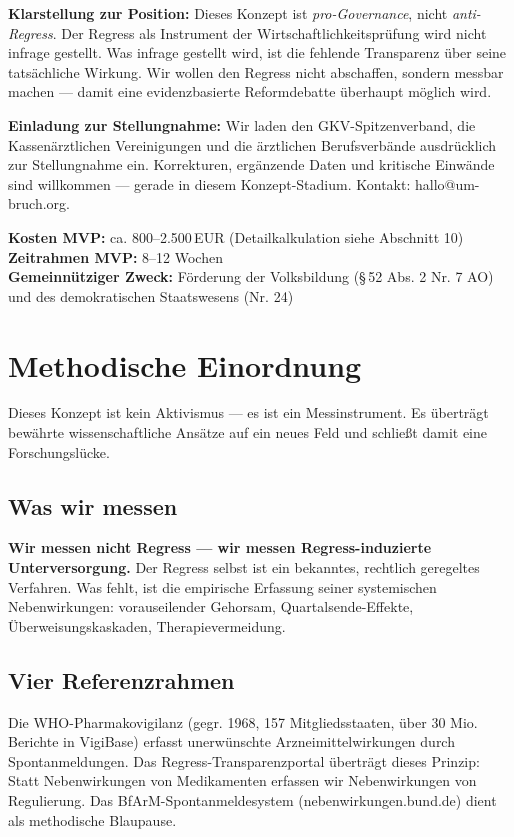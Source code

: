 \documentclass{umbruch-position}
\begin{document}
\textbf{Klarstellung zur Position:} Dieses Konzept ist \textit{pro-Governance}, nicht \textit{anti-Regress}. Der Regress als Instrument der Wirtschaftlichkeitsprüfung wird nicht infrage gestellt. Was infrage gestellt wird, ist die fehlende Transparenz über seine tatsächliche Wirkung. Wir wollen den Regress nicht abschaffen, sondern messbar machen --- damit eine evidenzbasierte Reformdebatte überhaupt möglich wird.

\textbf{Einladung zur Stellungnahme:} Wir laden den GKV-Spitzenverband, die Kassenärztlichen Vereinigungen und die ärztlichen Berufsverbände ausdrücklich zur Stellungnahme ein. Korrekturen, ergänzende Daten und kritische Einwände sind willkommen --- gerade in diesem Konzept-Stadium. Kontakt: hallo@um-bruch.org.

\textbf{Kosten MVP:} ca. 800--2.500\,EUR (Detailkalkulation siehe Abschnitt 10)\\
\textbf{Zeitrahmen MVP:} 8--12 Wochen\\
\textbf{Gemeinnütziger Zweck:} Förderung der Volksbildung (\S\,52 Abs. 2 Nr. 7 AO) und des demokratischen Staatswesens (Nr. 24)


\section{Methodische Einordnung}

Dieses Konzept ist kein Aktivismus — es ist ein Messinstrument. Es überträgt bewährte wissenschaftliche Ansätze auf ein neues Feld und schließt damit eine Forschungslücke.

\subsection{Was wir messen}

\textbf{Wir messen nicht Regress — wir messen Regress-induzierte Unterversorgung.} Der Regress selbst ist ein bekanntes, rechtlich geregeltes Verfahren. Was fehlt, ist die empirische Erfassung seiner systemischen Nebenwirkungen: vorauseilender Gehorsam, Quartalsende-Effekte, Überweisungskaskaden, Therapievermeidung.

\subsection{Vier Referenzrahmen}

\begin{infobox}
Die WHO-Pharmakovigilanz (gegr. 1968, 157 Mitgliedsstaaten, über 30 Mio. Berichte in VigiBase) erfasst unerwünschte Arzneimittelwirkungen durch Spontanmeldungen. Das Regress-Transparenzportal überträgt dieses Prinzip: Statt Nebenwirkungen von Medikamenten erfassen wir Nebenwirkungen von Regulierung. Das BfArM-Spontanmeldesystem (nebenwirkungen.bund.de) dient als methodische Blaupause.
\end{infobox}
\end{document}
